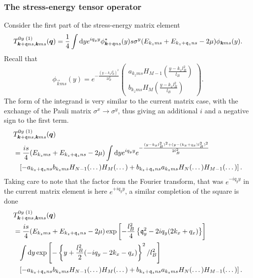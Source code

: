 \subsubsection{The stress-energy tensor operator}
Consider the first part of the stress-energy matrix element
\begin{equation}
\label{eq:53}
T^{0y \;(1)}_{\bm{k}+\mathfrak{q}ns, \bm{k}ms} (\bm{q})
=
\frac{1}{4}
\int \mathrm{d}y e^{iq_y y}
\phi ^* _{\bm{k}+\mathfrak{q} ns}(y) s \sigma ^y (E_{k_z m s} + E_{k_z+\mathfrak{q}_z n s}- 2\mu )
\phi _{\bm{k} ms}(y).
\end{equation}
Recall that 
\begin{equation}
  \phi _{\vec{k}ms}(y) =
  e^{- \frac{(y - k_x l_B ^2)^2}{2 l_B^2}}
  \begin{pmatrix}
    a_{k_z ms} H_{M-1} \left( \frac{y-k_x l_B^2}{l_B} \right)\\
    b_{k_z ms} H_M \left( \frac{y - k_x l_B^2}{l_B} \right)
  \end{pmatrix}.
\end{equation}
The form of the integrand is very similar to the current matrix case, with the exchange of the Pauli matrix $\sigma ^x \to \sigma ^y$, thus giving an additional $i$ and a negative sign to the first term.
\begin{align}
&T^{0y \;(1)}_{\bm{k}+\mathfrak{q}ns, \bm{k}ms} (\bm{q})\\
  \nonumber &= \frac{i s}{4}
    (E_{k_z m s} + E_{k_z+\mathfrak{q}_z n s}- 2\mu )
    \int \mathrm{d}y e^{iq_y y} e^{- \frac{(y-k_xl_B^2)^2 + (y-(k_x + q_x) l_B^2)^2}{2 l_B^2}}\\
    \nonumber & \phantom{=} \left[
    - a_{k_z+\mathfrak{q}_z ns} b_{k_z ms} H_{N-1} (\dots ) H_M(\dots )
    + b_{k_z+\mathfrak{q}_z ns} a_{k_zms} H_N(\dots ) H_{M-1}(\dots )
    \right].
\end{align}
Taking care to note that the factor from the Fourier transform, that was $e^{-iq_y y}$ in the current matrix element is here $e^{+ i q_y y}$, a similar completion of the square is done 
\begin{equation}
  \begin{split}
    &T^{0y \;(1)}_{\bm{k}+\mathfrak{q}ns, \bm{k}ms} (\bm{q})\\
    &=
    \frac{i s}{4}
    (E_{k_z m s} + E_{k_z+\mathfrak{q}_z n s}- 2\mu )
    \exp \left[
      -\frac{l_B^2}{4} \left\{ \mathfrak{q}_y^2 - 2 i q_y (2 k_x + q_x) \right\}
    \right]\\
    &\phantom{=} \int \mathrm{d}y
    \exp \left[
      -\left\{ y + \frac{l_B^2}{2} (-iq_y - 2 k_x - q_x) \right\}^2 / l_B^2
    \right]\\
    &\phantom{=} \left[
      - a_{k_z+\mathfrak{q}_z ns} b_{k_z ms} H_{N-1} (\dots ) H_M(\dots )
      + b_{k_z+\mathfrak{q}_z ns} a_{k_zms} H_N(\dots ) H_{M-1}(\dots )
    \right].
  \end{split}
\end{equation}
